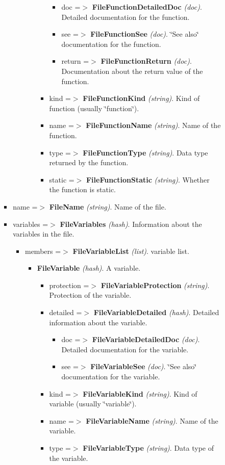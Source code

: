 \begin{itemize}
\begin{itemize}
\begin{itemize}
\begin{itemize}
\begin{itemize}
\begin{itemize}
\begin{itemize}
\begin{itemize}
\begin{itemize}
\end{itemize}
\item doc =$>$ {\bf FileFunctionDetailedDoc} {\em (doc)\/}. Detailed documentation for the function. \item see =$>$ {\bf FileFunctionSee} {\em (doc)\/}. \char`\"{}See also\char`\"{} documentation for the function. \item return =$>$ {\bf FileFunctionReturn} {\em (doc)\/}. Documentation about the return value of the function. \end{itemize}
\item kind =$>$ {\bf FileFunctionKind} {\em (string)\/}. Kind of function (usually \char`\"{}function\char`\"{}). \item name =$>$ {\bf FileFunctionName} {\em (string)\/}. Name of the function. \item type =$>$ {\bf FileFunctionType} {\em (string)\/}. Data type returned by the function. \item static =$>$ {\bf FileFunctionStatic} {\em (string)\/}. Whether the function is static. \end{itemize}
\end{itemize}
\end{itemize}
\item name =$>$ {\bf FileName} {\em (string)\/}. Name of the file. \item variables =$>$ {\bf FileVariables} {\em (hash)\/}. Information about the variables in the file. \begin{itemize}
\item members =$>$ {\bf FileVariableList} {\em (list)\/}. variable list. \begin{itemize}
\item {\bf FileVariable} {\em (hash)\/}. A variable. \begin{itemize}
\item protection =$>$ {\bf FileVariableProtection} {\em (string)\/}. Protection of the variable. \item detailed =$>$ {\bf FileVariableDetailed} {\em (hash)\/}. Detailed information about the variable. \begin{itemize}
\item doc =$>$ {\bf FileVariableDetailedDoc} {\em (doc)\/}. Detailed documentation for the variable. \item see =$>$ {\bf FileVariableSee} {\em (doc)\/}. \char`\"{}See also\char`\"{} documentation for the variable. \end{itemize}
\item kind =$>$ {\bf FileVariableKind} {\em (string)\/}. Kind of variable (usually \char`\"{}variable\char`\"{}). \item name =$>$ {\bf FileVariableName} {\em (string)\/}. Name of the variable. \item type =$>$ {\bf FileVariableType} {\em (string)\/}. Data type of the variable. \end{itemize}

\end{itemize}
\end{itemize}
\end{itemize}
\end{itemize}
\end{itemize}
\end{itemize}
